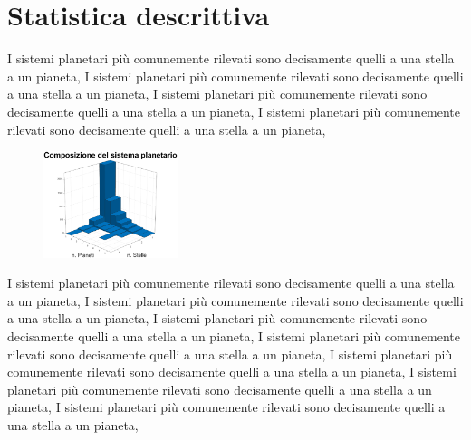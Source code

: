 \section{Statistica descrittiva}
I sistemi planetari più comunemente rilevati sono decisamente quelli a una stella a un pianeta, I sistemi planetari più comunemente rilevati sono decisamente quelli a una stella a un pianeta, I sistemi planetari più comunemente rilevati sono decisamente quelli a una stella a un pianeta, I sistemi planetari più comunemente rilevati sono decisamente quelli a una stella a un pianeta, 
\begin{figure}

   
	\centering
    \includegraphics[width=0.35\textwidth]{Figure/hist_sistema_planetario} 
	
   

\end{figure}
I sistemi planetari più comunemente rilevati sono decisamente quelli a una stella a un pianeta, I sistemi planetari più comunemente rilevati sono decisamente quelli a una stella a un pianeta, I sistemi planetari più comunemente rilevati sono decisamente quelli a una stella a un pianeta, I sistemi planetari più comunemente rilevati sono decisamente quelli a una stella a un pianeta, I sistemi planetari più comunemente rilevati sono decisamente quelli a una stella a un pianeta, I sistemi planetari più comunemente rilevati sono decisamente quelli a una stella a un pianeta, I sistemi planetari più comunemente rilevati sono decisamente quelli a una stella a un pianeta, 